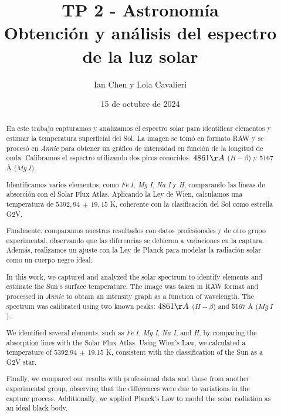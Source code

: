 \documentclass[11pt, a4paper]{article}
\title{TP 2 - Astronomía\\Obtención y análisis del espectro de la luz solar}
\author{Ian Chen y Lola Cavalieri}
\date{15 de octubre de 2024}
\begin{document}
\maketitle
{}
\begin{abstract}
En este trabajo capturamos y analizamos el espectro solar para identificar elementos y estimar la temperatura superficial del Sol. La imagen se tomó en formato RAW y se procesó en \textit{Annie} para obtener un gráfico de intensidad en función de la longitud de onda. Calibramos el espectro utilizando dos picos conocidos: $4861 \AA$ ($H-\beta$) y 5167 Å ($Mg\ I$).  

Identificamos varios elementos, como $Fe\ I$, \textit{Mg I}, \textit{Na I} y \textit{H}, comparando las líneas de absorción con el Solar Flux Atlas. Aplicando la Ley de Wien, calculamos una temperatura de $5392,94 \, \pm \, 19,15$ K, coherente con la clasificación del Sol como estrella G2V.  

Finalmente, comparamos nuestros resultados con datos profesionales y de otro grupo experimental, observando que las diferencias se debieron a variaciones en la captura. Además, realizamos un ajuste con la Ley de Planck para modelar la radiación solar como un cuerpo negro ideal.

\end{abstract}


\begin{abstract}
In this work, we captured and analyzed the solar spectrum to identify elements and estimate the Sun's surface temperature. The image was taken in RAW format and processed in \textit{Annie} to obtain an intensity graph as a function of wavelength. The spectrum was calibrated using two known peaks: $4861 \AA$ ($H-\beta$) and 5167 Å ($Mg\ I$).  

We identified several elements, such as $Fe\ I$, \textit{Mg I}, \textit{Na I}, and \textit{H}, by comparing the absorption lines with the Solar Flux Atlas. Using Wien's Law, we calculated a temperature of $5392.94 \, \pm \, 19.15$ K, consistent with the classification of the Sun as a G2V star.  

Finally, we compared our results with professional data and those from another experimental group, observing that the differences were due to variations in the capture process. Additionally, we applied Planck’s Law to model the solar radiation as an ideal black body.

\end{abstract}
\end{document}
